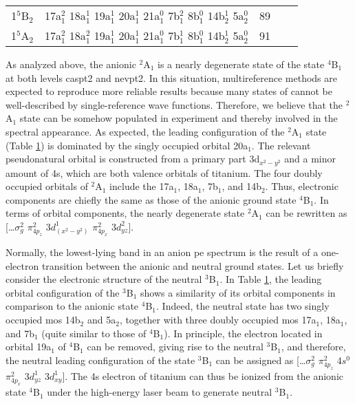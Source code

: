 \begin{refsection}
\begin{center}
\begin{landscape}
\begin{longtable}{@{}ccccc@{}}
	1$^5$B$_2$   & 17a$_1^2$ 18a$_1^1$ 19a$_1^1$ 20a$_1^1$ 21a$_1^0$ 7b$_1^2$ 8b$_1^0$ 14b$_2^1$ 5a$_2^0$  & 89   &    &                    \\
	1$^5$A$_2$   & 17a$_1^2$ 18a$_1^2$ 19a$_1^1$ 20a$_1^1$ 21a$_1^0$ 7b$_1^1$ 8b$_1^0$ 14b$_2^1$ 5a$_2^0$  & 91   &    &                     
	\label{tbl4:ldconfig}
\end{longtable}                                                                          
\end{landscape}
\end{center}


As analyzed above, the anionic $^2$A$_1$ is a nearly degenerate state of the state $^4$B$_1$ at both levels \acrshort{caspt2} and \acrshort{nevpt2}. In this situation, multireference methods are expected to reproduce more reliable results because many states of  cannot be well-described by single-reference wave functions. Therefore, we believe that the $^2$A$_1$ state can be somehow populated in experiment and thereby involved in the spectral appearance. As expected, the leading configuration of the $^2$A$_1$ state (Table \ref{tbl4:ldconfig}) is dominated by the singly occupied orbital 20a$_1$. The relevant pseudonatural orbital is constructed from a primary part 3d$_{x^2-y^2}$ and a minor amount of 4s, which are both valence orbitals of titanium. The four doubly occupied orbitals of $^2$A$_1$ include the 17a$_1$, 18a$_1$, 7b$_1$, and 14b$_2$. Thus, electronic components are chiefly the same as those of the anionic ground state $^4$B$_1$. In terms of orbital components, the nearly degenerate state $^2$A$_1$ can be rewritten as [\ldots $\sigma_g^2$ $\pi^2_{4p_z}$ 3$d_{(x^2-y^2)}^1$ $\pi_{4p_x}^2$ 3$d^2_{yz}$].


Normally, the lowest-lying band in an anion \acrshort{pe} spectrum is the result of a one-electron transition between the anionic and neutral ground states. Let us briefly consider the electronic structure of the neutral $^3$B$_1$. In Table \ref{tbl4:ldconfig}, the leading orbital configuration of the $^3$B$_1$ shows a similarity of its orbital components in comparison to the anionic state $^4$B$_1$. Indeed, the neutral state has two singly occupied \acrshort{mo}s 14b$_2$ and 5a$_2$, together with three doubly occupied \acrshort{mo}s 17a$_1$, 18a$_1$, and 7b$_1$ (quite similar to those of $^4$B$_1$). In principle, the electron located in orbital 19a$_1$ of $^4$B$_1$ can be removed, giving rise to the neutral $^3$B$_1$, and therefore, the neutral leading configuration of the state $^3$B$_1$ can be assigned as [\ldots $\sigma_g^2$ $\pi_{4p_z}^2$ 4$s^0$ $\pi_{4p_x}^2$ 3$d_{yz}^1$ 3$d_{xy}^1$]. The 4s electron of titanium can thus be ionized from the anionic state $^4$B$_1$ under the high-energy laser beam to generate neutral $^3$B$_1$.





\end{refsection}
